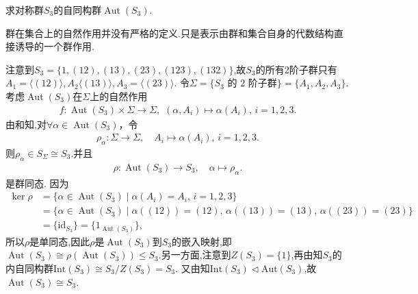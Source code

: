 \documentclass[../../main.tex]{subfiles}%
\begin{document}
\begin{example}
求对称群$S_3$的自同构群$\operatorname{Aut}(S_3)$.
\end{example}
\begin{remark}
群在集合上的自然作用并没有严格的定义.只是表示由群和集合自身的代数结构直接诱导的一个群作用.
\end{remark}
\begin{solution}
注意到$S_3=\{1, (12), (13), (23), (123), (132)\}$,故$S_3$的所有2阶子群只有$A_1=\langle (12)\rangle ,A_2\langle (13)\rangle ,A_3=\langle (23)\rangle $.
令$\Sigma = \{S_3 \text{ 的 } 2 \text{ 阶子群}\} = \{A_1, A_2, A_3\}$. 考虑$\operatorname{Aut}(S_3)$在$\Sigma$上的自然作用
\begin{align*}
f:\operatorname{Aut}(S_3) \times \Sigma \to \Sigma ,\,\,(\alpha,A_i)\mapsto \alpha(A_i),\,i=1,2,3.
\end{align*}
由和知,对$\forall \alpha \in \operatorname{Aut}(S_3)$，令
\begin{align*}
\rho_\alpha:\Sigma\rightarrow \Sigma,\quad A_i\mapsto \alpha(A_i),\,i=1,2,3.
\end{align*}
则$\rho_\alpha\in S_{\Sigma}\cong S_3$.并且
\begin{align*}
\rho:\operatorname{Aut}(S_3)\rightarrow S_3,\quad \alpha\mapsto \rho_\alpha.
\end{align*}
是群同态. 因为
\begin{align*}
\operatorname{ker} \rho &= \{\alpha \in \operatorname{Aut}(S_3) \mid \alpha(A_i) = A_i, \, i = 1, 2, 3\} \\
&= \{\alpha \in \operatorname{Aut}(S_3) \mid \alpha((12)) = (12), \, \alpha((13)) = (13), \, \alpha((23)) = (23)\} \\
&= \{\text{id}_{S_3}\}=\{1_{\operatorname{Aut}(S_3)}\},
\end{align*}
所以$\rho$是单同态,因此$\rho$是$\operatorname{Aut}(S_3)$到$ S_3$的嵌入映射,即$\operatorname{Aut}(S_3)\cong \rho(\operatorname{Aut}(S_3))\leqslant S_3$.另一方面,注意到$Z(S_3)=\{1\}$,再由知$S_3$的内自同构群$\text{Int}(S_3)\cong S_3 / Z(S_3) = S_3$. 又由知$\text{Int}(S_3)\lhd \text{Aut}(S_3)$,故
$\operatorname{Aut}(S_3) \cong S_3$.

\end{solution}
\end{document}
